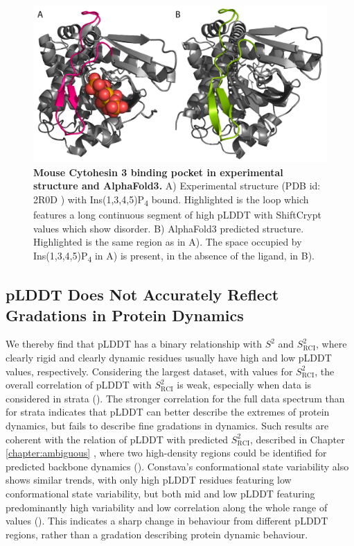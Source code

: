 \begin{figure}[tbh]
    \centering
    \includegraphics[width=1\linewidth]{figures/af3_pocket.pdf}
    \caption{\textbf{Mouse Cytohesin 3 binding pocket in experimental structure and AlphaFold3.} A) Experimental structure (PDB id: 2R0D \cite{dinitto_structural_2007}) with Ins(1,3,4,5)P\textsubscript{4} bound. Highlighted is the loop which features a long continuous segment of high pLDDT with ShiftCrypt values which show disorder. B) AlphaFold3 predicted structure. Highlighted is the same region as in A). The space occupied by Ins(1,3,4,5)P\textsubscript{4} in A) is present, in the absence of the ligand, in B).}
    \label{fig:discussion:af3_pocket}
\end{figure}


\subsection{pLDDT Does Not Accurately Reflect Gradations in Protein Dynamics}

We thereby find that pLDDT has a binary relationship with $S^{2}$ and $S^{2}_{\text{RCI}}$, where clearly rigid and clearly dynamic residues usually have high and low pLDDT values, respectively. Considering the largest dataset, with values for $S^{2}_{\text{RCI}}$, the overall correlation of pLDDT with $S^{2}_{\text{RCI}}$ is weak, especially when data is considered in strata (). The stronger correlation for the full data spectrum than for strata indicates that pLDDT can better describe the extremes of protein \gls{dynamics}, but fails to describe fine gradations in \gls{dynamics}. Such results are coherent with the relation of pLDDT with predicted $S^{2}_{\text{RCI}}$, described in Chapter \ref{chapter:ambiguous} \cite{roca-martinez_challenges_2022}, where two high-density regions could be identified for predicted backbone \gls{dynamics} (). Constava's conformational state variability also shows similar trends, with only high pLDDT residues featuring low conformational state variability, but both mid and low pLDDT featuring predominantly high variability and low correlation along the whole range of values (). This indicates a sharp change in behaviour from different pLDDT regions, rather than a gradation describing protein dynamic behaviour.


